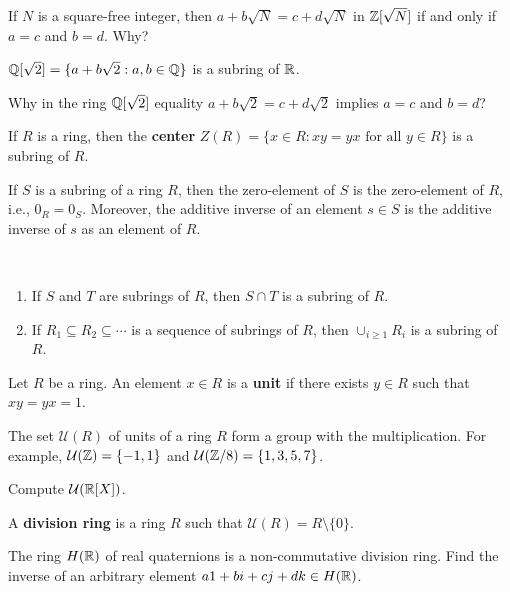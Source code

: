 If $N$ is a square-free integer, then 
$a+b\sqrt{N}=c+d\sqrt{N}$ in $\mathbb{Z}[\sqrt{N}]$ 
if and only if $a=c$ and $b=d$. Why?

\begin{example}
    $\mathbb{Q}[\sqrt{2}]=\{a+b\sqrt{2}:a,b\in\mathbb{Q}\}$ is a subring of $\mathbb{R}$. 
\end{example}

Why in the ring $\mathbb{Q}[\sqrt{2}]$ 
equality $a+b\sqrt{2}=c+d\sqrt{2}$ implies $a=c$ and $b=d$?

\begin{example}
    If $R$ is a ring, then the \textbf{center} 
    $Z(R)=\{x\in R:xy=yx\text{ for all $y\in R$}\}$ 
    is a subring of $R$. 
\end{example}

If $S$ is a subring of a ring $R$, then the zero-element 
of $S$ is the zero-element of $R$, i.e., $0_R=0_S$. Moreover, 
the additive inverse of an element $s\in S$ 
is the additive inverse of $s$ as an element of $R$. 	

\begin{exercise}\
\begin{enumerate}
	\item If $S$ and $T$ are subrings of $R$, then $S\cap T$ is a subring of $R$.
	\item If $R_1\subseteq R_2\subseteq\cdots$ is a sequence of subrings of $R$, then 
	$\cup_{i\geq1}R_i$ is a subring of $R$. 
\end{enumerate}
\end{exercise}

\begin{definition}
	Let $R$ be a ring. An element $x\in R$ is 
	a \textbf{unit} if there exists $y\in R$ such that $xy=yx=1$. 
\end{definition}

The set $\mathcal{U}(R)$ of units of a ring $R$ form 
a group with the multiplication. For example, $\mathcal{U}(\mathbb{Z})=\{-1,1\}$ and 
$\mathcal{U}(\mathbb{Z}/8)=\{1,3,5,7\}$. 

\begin{exercise}
\label{xca:units_R[X]}
Compute $\mathcal{U}(\mathbb{R}[X])$.
\end{exercise}

\begin{definition}
	A \textbf{division ring} is a ring $R$ 
	such that $\mathcal{U}(R)=R\setminus\{0\}$.  	
\end{definition}

The ring $H(\mathbb{R})$ of real quaternions is a non-commutative division ring. Find the inverse of
an arbitrary element $a1+bi+cj+dk\in H(\mathbb{R})$. 

